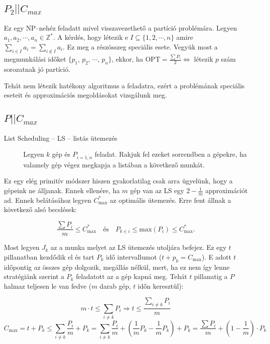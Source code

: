 \subsection{ \texorpdfstring {$ P_2||C_{max}$} {P2||Cmax} }

Ez egy NP--nehéz feladatt mivel visszavezethető a partíció problémára. Legyen
$a_1, a_2, \cdots, a_n \in \mathbb{Z}^*$. A kérdés, hogy létezik e $I \subseteq
\{1,2, \cdots, n \}$ amire $\sum_{i \in I} a_i = \sum_{i \not \in I} a_i$. Ez
meg a részösszeg speciális esete. Vegyük most a megmunkálási időket $\{p_1$, $p_2$,
$\cdots$, $p_n\}$, ekkor, ha OPT$=\frac{\sum P_i}{2} \Leftrightarrow$ létezik $p$
szám sorozatnak jó partíció. 

Tehát nem létezik hatékony algoritmus a feladatra, ezért a problémának speciális
eseteit és approximációs megoldásokat vizsgálunk meg.

\subsection{ \texorpdfstring {$ P||C_{max}$} {P||Cmax} }

\begin{description}
  \item[List Scheduling -- LS -- listás ütemezés] Legyen $k$ gép és
  $P_{i=\overline{1,n}}$ feladat. Rakjuk fel ezeket sorrendben a gépekre, ha
  valamely gép végez megkapja a listában a következő munkát.
\end{description}

Ez egy elég primitív módszer hiszen gyakorlatilag csak arra ügyelünk, hogy a
gépeink ne álljanak. Ennek ellenére, ha $m$ gép van  az LS egy $2 - \frac{1}{m}$
approximációt ad. Ennek belátásához legyen $C^*_{\mbox{max}}$ az optimális
ütemezés. Erre fent állnak a következő alsó becslések:

\[ \frac{\sum P_i}{m} \leq C^*_{\mbox{max}} ~~~\mbox{ és }~~~
   P_{k \in i} \leq \mbox{max} (P_i) \leq C^*_{\mbox{max}}. 
\]

Most legyen $J_k$ az a munka melyet az LS ütemezés utoljára befejez. Ez egy $t$
pillanatban kezdődik el és tart $P_k$ idő intervallumot ($t+p_k=C_{\mbox{max}}$).
E adott $t$ időpontig az összes gép dolgozik, megállás nélkül, mert, ha ez nem
így lenne stratégiánk szerint a $P_k$ feladatott az a gép kapná meg. Tehát $t$
pillanatig a $P$ halmaz teljesen le van fedve ($m$ darab gép, $t$ időn
keresztül):

\[ m \cdot t \leq \sum_{i \neq k}P_i \Rightarrow t \leq \frac{\sum\limits_{i \neq k}P_i}{m} 
\]
\[ C_{\mbox{max}}=t+P_k \leq \sum_{i \neq  k} \frac{P_i}{m} + P_k = \sum_{i \neq
 k} \frac{P_i}{m} + \left(\frac{1}{m} P_k - \frac{1}{m} P_k\right) + P_k 
 = \frac{\sum P_i}{m} + \left(1-\frac{1}{m}\right) \cdot P_k
\]

